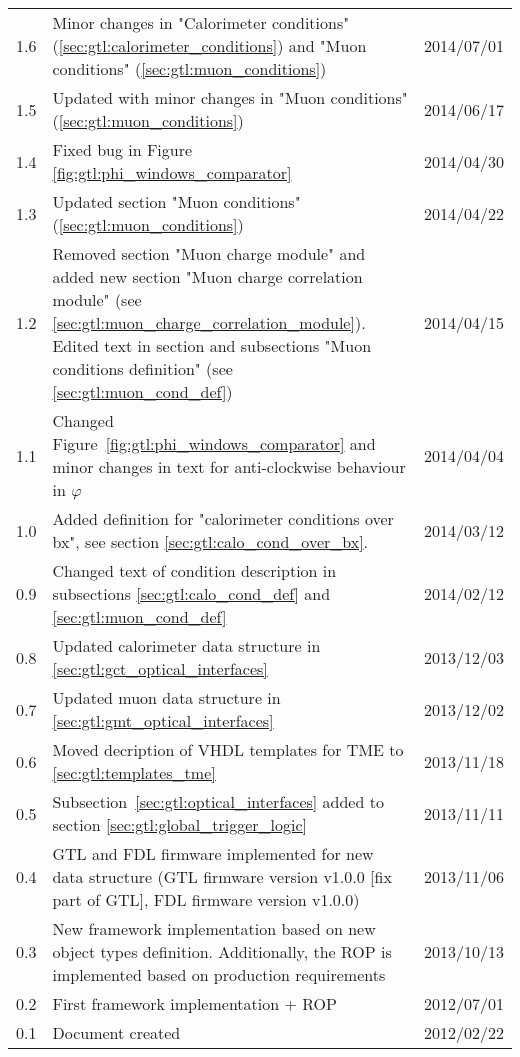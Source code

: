 \begin{longtable}{|c|p{}|c|}
1.6 & Minor changes in "Calorimeter conditions" (\ref{sec:gtl:calorimeter_conditions}) and "Muon conditions" (\ref{sec:gtl:muon_conditions}) & 2014/07/01\\
1.5 & Updated with minor changes in "Muon conditions" (\ref{sec:gtl:muon_conditions}) & 2014/06/17\\
1.4 & Fixed bug in Figure \ref{fig:gtl:phi_windows_comparator} & 2014/04/30\\
1.3 & Updated section "Muon conditions" (\ref{sec:gtl:muon_conditions}) & 2014/04/22\\
1.2 & Removed section "Muon charge module" and added new section "Muon charge correlation module" (see \ref{sec:gtl:muon_charge_correlation_module}).
Edited text in section and subsections "Muon conditions definition" (see \ref{sec:gtl:muon_cond_def}) & 2014/04/15\\
1.1 & Changed Figure~\ref{fig:gtl:phi_windows_comparator} and minor changes in text for anti-clockwise behaviour in $\varphi$ & 2014/04/04\\
1.0 & Added definition for "calorimeter conditions over bx", see section \ref{sec:gtl:calo_cond_over_bx}. & 2014/03/12\\ 
0.9 & Changed text of condition description in subsections \ref{sec:gtl:calo_cond_def} and \ref{sec:gtl:muon_cond_def} & 2014/02/12\\
0.8 & Updated calorimeter data structure in \ref{sec:gtl:gct_optical_interfaces} & 2013/12/03\\
0.7 & Updated muon data structure in \ref{sec:gtl:gmt_optical_interfaces} & 2013/12/02\\
0.6 & Moved decription of VHDL templates for TME to \ref{sec:gtl:templates_tme} & 2013/11/18\\
0.5 & Subsection~\ref{sec:gtl:optical_interfaces} added to section \ref{sec:gtl:global_trigger_logic} & 2013/11/11\\
0.4 & GTL and FDL firmware implemented for new data structure (GTL firmware version v1.0.0 [fix part of GTL], FDL firmware version v1.0.0) & 2013/11/06\\
0.3 & New framework implementation based on new object types definition. Additionally, the ROP is implemented based on production requirements & 2013/10/13\\
0.2 & First framework implementation + ROP  & 2012/07/01\\
0.1 & Document created & 2012/02/22\\
\hline
\end{longtable}

\clearpage{}
